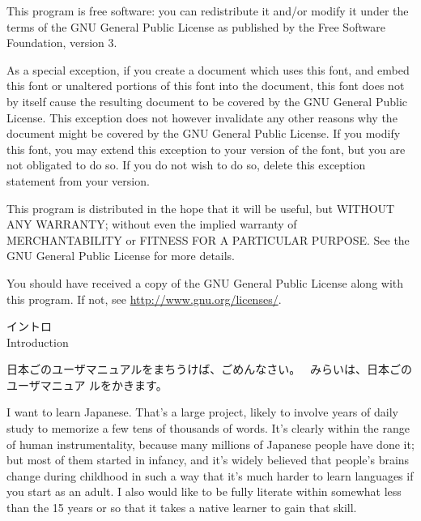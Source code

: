 \documentclass[14pt]{extarticle}
\newcommand{\blsection}[2]{%
\kaku\clearpage\Large\phantomsection%
\addcontentsline{toc}{section}{#1 #2}%
#1\\ #2\par\addpenalty{-300}\normalsize}
\begin{document}
This program is free software: you can redistribute it and/or modify
it under the terms of the GNU General Public License as published by
the Free Software Foundation, version 3.

As a special exception, if you create a document which uses this font, and
embed this font or unaltered portions of this font into the document, this
font does not by itself cause the resulting document to be covered by the
GNU General Public License. This exception does not however invalidate any
other reasons why the document might be covered by the GNU General Public
License. If you modify this font, you may extend this exception to your
version of the font, but you are not obligated to do so. If you do not
wish to do so, delete this exception statement from your version.

This program is distributed in the hope that it will be useful,
but WITHOUT ANY WARRANTY; without even the implied warranty of
MERCHANTABILITY or FITNESS FOR A PARTICULAR PURPOSE.  See the
GNU General Public License for more details.

You should have received a copy of the GNU General Public License
along with this program.  If not, see \url{http://www.gnu.org/licenses/}.

\clearpage


\renewcommand\contentsname{目次　Contents}
\renewcommand{\cftbeforesubsecskip}{0pt}

\tableofcontents

\clearpage


\blsection{イントロ}{Introduction}

日本ごのユーザマニュアルをまちうけば、ごめんなさい。~%
みらいは、日本ごのユーザマニュア
ルをかきます。

I want to learn Japanese.  That's a large project, likely to involve years
of daily study to memorize a few tens of thousands of words.  It's clearly
within the range of human instrumentality, because many millions of Japanese
people have done it; but most of them started in infancy, and it's widely
believed that people's brains change during childhood in such a way that
it's much harder to learn languages if you start as an adult.  I also would
like to be fully literate within somewhat less than the 15 years or so that
it takes a native learner to gain that skill.
\end{document}
